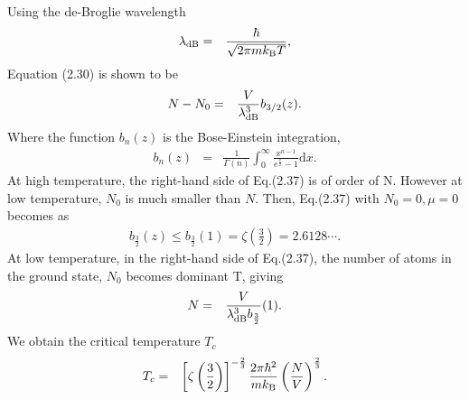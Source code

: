 \documentclass[12pt,a4paper]{report}
\newcommand{\diff}{\mathrm{d}}				            %
\newcommand{\kb} {k_{\rm B}}				            %
\begin{document}
Using the de-Broglie wavelength
\begin{eqnarray}
\lambda_{\rm dB} & = & \frac{\hbar}{\sqrt{2 \pi m \kb T}},
\end{eqnarray}
Equation (2.30) is shown to be
\begin{eqnarray}
N - N_0 & = & \frac{V}{\lambda_{\rm dB}^3} b_{3/2} (z).
\end{eqnarray}
Where the function $b_{n}(z)$ is the Bose-Einstein integration, 
\begin{eqnarray}
b_n (z) & = & \frac{1}{\Gamma (n)} \int_0^\infty \frac{x^{n-1}}{e^{\frac{x}{z}}-1} \diff x.
\end{eqnarray}
At high temperature, the right-hand side of Eq.(2.37) is of order of N. However at low temperature,
$N_0$ is much smaller than $N$.
Then, Eq.(2.37) with $N_0 = 0, \mu = 0$ becomes as
\begin{eqnarray}
b_{\frac{3}{2}}(z) \leq b_{\frac{3}{2}}(1) = \zeta \left( \frac{3}{2} \right) = 2.6128 \cdots.
\end{eqnarray}
At low temperature, in the right-hand side of Eq.(2.37),
the number of atoms in the ground state, $N_0$ becomes dominant T, giving
\begin{eqnarray}
N & = & \frac{V}{\lambda_{\rm dB}^3 b_{\frac{3}{2}} }(1).
\end{eqnarray}
We obtain the critical temperature $T_c$
\begin{eqnarray}
T_c & = &
\left[ \zeta \left( \frac{3}{2} \right) \right]^{-\frac{2}{3}} \frac{2 \pi \hbar^2}{m \kb} \left( \frac{N}{V} \right)^{\frac{2}{3}}.
\end{eqnarray}
\end{document}
